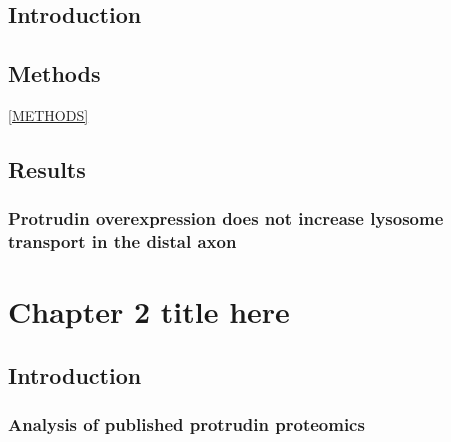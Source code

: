 \documentclass[
]{book}
\newenvironment{Shaded}{\begin{snugshade}}{\end{snugshade}}
\newcommand{\CommentTok}[1]{\textcolor[rgb]{0.56,0.35,0.01}{\textit{#1}}}
\newcommand{\DataTypeTok}[1]{\textcolor[rgb]{0.13,0.29,0.53}{#1}}
\newcommand{\KeywordTok}[1]{\textcolor[rgb]{0.13,0.29,0.53}{\textbf{#1}}}
\newcommand{\NormalTok}[1]{#1}
\newcommand{\OperatorTok}[1]{\textcolor[rgb]{0.81,0.36,0.00}{\textbf{#1}}}
\newcommand{\OtherTok}[1]{\textcolor[rgb]{0.56,0.35,0.01}{#1}}
\begin{document}
\hypertarget{introduction}{%
\section{Introduction}\label{introduction}}

\lipsum

\hypertarget{methods}{%
\section{Methods}\label{methods}}

\ref{METHODS}

\hypertarget{results}{%
\section{Results}\label{results}}

\hypertarget{protrudin-overexpression-does-not-increase-lysosome-transport-in-the-distal-axon}{%
\subsection{Protrudin overexpression does not increase lysosome transport in the distal axon}\label{protrudin-overexpression-does-not-increase-lysosome-transport-in-the-distal-axon}}

\hypertarget{chapter-2-title-here}{%
\chapter{Chapter 2 title here}\label{chapter-2-title-here}}

\hypertarget{introduction-1}{%
\section{Introduction}\label{introduction-1}}

\lipsum

\hypertarget{analysis-of-published-protrudin-proteomics}{%
\subsection{Analysis of published protrudin proteomics}\label{analysis-of-published-protrudin-proteomics}}

\begin{Shaded}
\end{Shaded}
\end{document}
